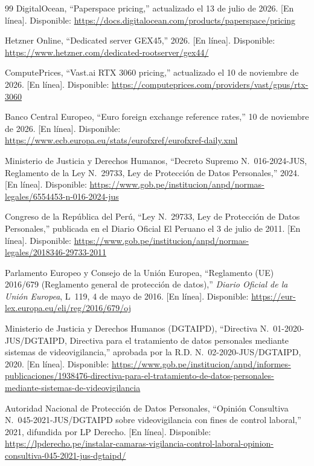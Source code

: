 \documentclass[12pt,a4paper]{article}
\begin{document}
\begin{thebibliography}{99}
DigitalOcean, ``Paperspace pricing,'' actualizado el 13 de julio de 2026.
[En línea]. Disponible: \url{https://docs.digitalocean.com/products/paperspace/pricing}

Hetzner Online, ``Dedicated server GEX45,'' 2026. [En línea]. Disponible:
\url{https://www.hetzner.com/dedicated-rootserver/gex44/}

ComputePrices, ``Vast.ai RTX 3060 pricing,'' actualizado el 10 de noviembre de
2026. [En línea]. Disponible:
\url{https://computeprices.com/providers/vast/gpus/rtx-3060}

Banco Central Europeo, ``Euro foreign exchange reference rates,'' 10 de
noviembre de 2026. [En línea]. Disponible:
\url{https://www.ecb.europa.eu/stats/eurofxref/eurofxref-daily.xml}

Ministerio de Justicia y Derechos Humanos, ``Decreto Supremo N.\textdegree~016-2024-JUS,
Reglamento de la Ley N.\textdegree~29733, Ley de Protección de Datos
Personales,'' 2024. [En línea]. Disponible:
\url{https://www.gob.pe/institucion/anpd/normas-legales/6554453-n-016-2024-jus}

Congreso de la República del Perú, ``Ley N.\textdegree~29733, Ley de Protección
de Datos Personales,'' publicada en el Diario Oficial El Peruano el 3 de julio
de 2011. [En línea]. Disponible:
\url{https://www.gob.pe/institucion/anpd/normas-legales/2018346-29733-2011}

Parlamento Europeo y Consejo de la Unión Europea, ``Reglamento (UE) 2016/679
(Reglamento general de protección de datos),'' \textit{Diario Oficial de la
Unión Europea}, L~119, 4 de mayo de 2016. [En línea]. Disponible:
\url{https://eur-lex.europa.eu/eli/reg/2016/679/oj}

Ministerio de Justicia y Derechos Humanos (DGTAIPD), ``Directiva
N.\textdegree~01-2020-JUS/DGTAIPD, Directiva para el tratamiento de datos
personales mediante sistemas de videovigilancia,'' aprobada por la R.D.
N.\textdegree~02-2020-JUS/DGTAIPD, 2020. [En línea]. Disponible:
\url{https://www.gob.pe/institucion/anpd/informes-publicaciones/1938476-directiva-para-el-tratamiento-de-datos-personales-mediante-sistemas-de-videovigilancia}

Autoridad Nacional de Protección de Datos Personales, ``Opinión Consultiva
N.\textdegree~045-2021-JUS/DGTAIPD sobre videovigilancia con fines de control
laboral,'' 2021, difundida por LP Derecho. [En línea]. Disponible:
\url{https://lpderecho.pe/instalar-camaras-vigilancia-control-laboral-opinion-consultiva-045-2021-jus-dgtaipd/}


\end{thebibliography}
\end{document}
